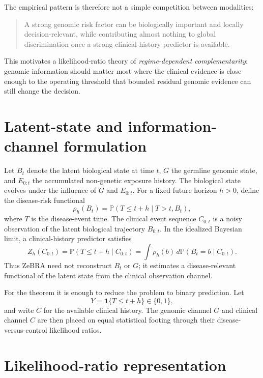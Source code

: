 \documentclass[journal]{IEEEtran}
\newcommand{\ind}{\mathbf{1}}
\begin{document}
The empirical pattern is therefore not a simple competition between modalities:
\begin{quote}
A strong genomic risk factor can be biologically important and locally decision-relevant, while contributing almost nothing to global discrimination once a strong clinical-history predictor is available.
\end{quote}

This motivates a likelihood-ratio theory of \emph{regime-dependent complementarity}: genomic information should matter most where the clinical evidence is close enough to the operating threshold that bounded residual genomic evidence can still change the decision.

\section{Latent-state and information-channel formulation}

Let $B_t$ denote the latent biological state at time $t$, $G$ the germline genomic state, and $E_{0:t}$ the accumulated non-genetic exposure history. The biological state evolves under the influence of $G$ and $E_{0:t}$. For a fixed future horizon $h>0$, define the disease-risk functional
\begin{equation}
\rho_h(B_t)
=\mathbb{P}(T\le t+h\mid T>t,B_t),
\label{eq:rho}
\end{equation}
where $T$ is the disease-event time. The clinical event sequence $C_{0:t}$ is a noisy observation of the latent biological trajectory $B_{0:t}$. In the idealized Bayesian limit, a clinical-history predictor satisfies
\begin{equation}
Z_h(C_{0:t})
=\mathbb{P}(T\le t+h\mid C_{0:t})
=\int \rho_h(b)\,d\mathbb{P}(B_t=b\mid C_{0:t}).
\label{eq:zposterior}
\end{equation}
Thus ZeBRA need not reconstruct $B_t$ or $G$; it estimates a disease-relevant functional of the latent state from the clinical observation channel.

For the theorem it is enough to reduce the problem to binary prediction. Let
\begin{equation}
Y=\ind\{T\le t+h\}\in\{0,1\},
\end{equation}
and write $C$ for the available clinical history. The genomic channel $G$ and clinical channel $C$ are then placed on equal statistical footing through their disease-versus-control likelihood ratios.

\section{Likelihood-ratio representation}
\end{document}
